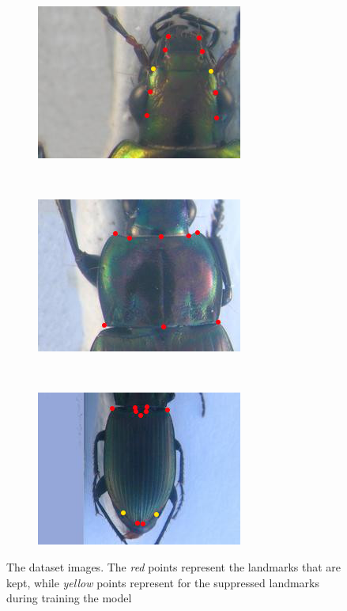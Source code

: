\documentclass[10pt]{article}
\begin{document}
\begin{figure}[htbp]
    \centering
    \begin{subfigure}[t]{0.16\textwidth}
        \centering
        \includegraphics[scale=0.4]{images/ftete}
    \end{subfigure}%
    ~ 
    \begin{subfigure}[t]{0.16\textwidth}
        \centering
        \includegraphics[scale=0.4]{images/fpronotum}
    \end{subfigure}%
    ~
	\begin{subfigure}[t]{0.156\textwidth}
        \centering
        \includegraphics[scale=0.4]{images/felytre}
    \end{subfigure}    
    \caption{The dataset images. The \textit{red} points represent the landmarks that are kept, while \textit{yellow} points represent for the suppressed landmarks during training the model} 
    \label{figshape3parts}
\end{figure}
\end{document}

